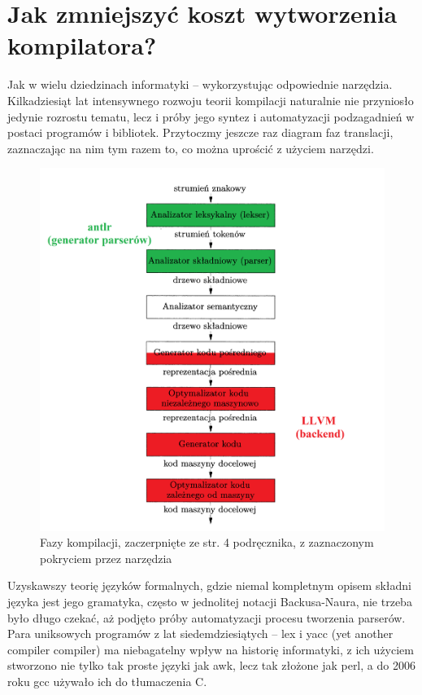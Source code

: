 

\section{Jak zmniejszyć koszt wytworzenia kompilatora?}
Jak w wielu dziedzinach informatyki – wykorzystując odpowiednie narzędzia. Kilkadziesiąt lat intensywnego rozwoju teorii kompilacji naturalnie nie przyniosło jedynie rozrostu tematu, lecz i próby jego syntez i automatyzacji podzagadnień w postaci programów i bibliotek. Przytoczmy jeszcze raz diagram faz translacji, zaznaczając na nim tym razem to, co można uprościć z użyciem narzędzi.
\begin{figure}[H]
    \centering
    \includegraphics[height=0.8\linewidth]{images/wstep/fazy_kompilacji.png_bin_antlr_llvm_podpisany_popr.png}
    \caption{Fazy kompilacji, zaczerpnięte ze str. 4 podręcznika\cite{DRAGON_BOOK}, z zaznaczonym pokryciem przez narzędzia}
\end{figure}


Uzyskawszy teorię języków formalnych, gdzie niemal kompletnym opisem składni języka jest jego gramatyka, często w jednolitej notacji Backusa-Naura, nie trzeba było długo czekać, aż podjęto próby automatyzacji procesu tworzenia parserów. Para uniksowych programów z lat siedemdziesiątych – lex i yacc (yet another compiler compiler) ma niebagatelny wpływ na historię informatyki, z ich użyciem stworzono nie tylko tak proste języki jak awk, lecz tak złożone jak perl\cite{parsing_timeline_kegler}, a do 2006 roku gcc używało ich do tłumaczenia C\cite{gcc_2006_release_note}.

